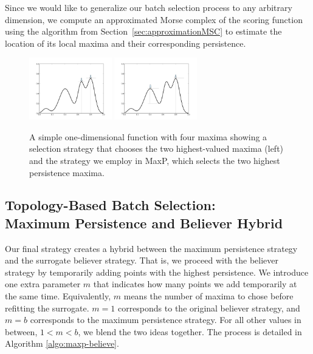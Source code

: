 Since we would like to generalize our batch selection process to any arbitrary dimension, we compute an approximated Morse complex of the scoring function using the algorithm from Section~\ref{sec:approximationMSC} to estimate the location of its local maxima and their corresponding persistence.

\begin{figure}[!ht]
\centering
\includegraphics[width=0.32\textwidth]{figs/chap5/persistence}
\includegraphics[width=0.32\textwidth]{figs/chap5/persistence2}
\caption{A simple one-dimensional function with four maxima showing a selection strategy that chooses the two highest-valued maxima (left) and the strategy we employ in MaxP, which selects the two highest persistence maxima.}
\label{fig:persistence}
\end{figure}

\subsection{Topology-Based Batch Selection:\\Maximum Persistence and Believer Hybrid}
Our final strategy creates a hybrid between the maximum persistence strategy and the surrogate believer strategy.
%
That is, we proceed with the believer strategy by temporarily adding points with the highest persistence.
%
We introduce one extra parameter $m$ that indicates how many points we add temporarily at the same time.
%
Equivalently, $m$ means the number of maxima to chose before refitting the surrogate.
%
$m=1$ corresponds to the original believer strategy, and $m = b$ corresponds to the maximum persistence strategy.
%
For all other values in between, $1 < m < b$, we blend the two ideas together.
%
The process is detailed in Algorithm \ref{algo:maxp-believe}.

